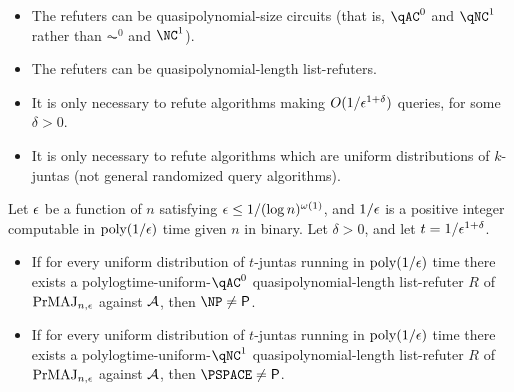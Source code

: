 \begin{itemize}
    \item The refuters can be quasipolynomial-size circuits (that is, $\qAC^0$ and 
    $\qNC^1$ rather than $\AC^0$ and $\NC^1$).
    \item The refuters can be quasipolynomial-length list-refuters. 
    \item It is only necessary to refute algorithms making $O(1/\epsilon^{1+\delta})$ queries,
    for some $\delta > 0$.
    \item It is only necessary to refute algorithms which are uniform distributions of
    $k$-juntas (not general randomized query algorithms).
\end{itemize}

\begin{theorem}
    Let $\epsilon$ be a function of $n$ satisfying $\epsilon \leq 1/(\log n)^{\omega(1)}$, and $1/\epsilon$ is a positive integer
    computable in $\text{poly}(1/\epsilon)$ time given $n$ in binary. Let $\delta > 0$, and let $t = 1/\epsilon^{1+\delta}$.
	\begin{itemize}
		\item If for every uniform distribution of $t$-juntas running in $\text{poly}(1/\epsilon)$ time there exists
        a polylogtime-uniform-$\qAC^0$ quasipolynomial-length list-refuter $R$ of $\mathrm{PrMAJ}_{n, \epsilon}$ against 
        $\mathcal{A}$, then $\NP \neq \PTIME$. 
		\item If for every uniform distribution of $t$-juntas running in $\text{poly}(1/\epsilon)$ time there exists
        a polylogtime-uniform-$\qNC^1$ quasipolynomial-length list-refuter $R$ of $\mathrm{PrMAJ}_{n, \epsilon}$ against 
        $\mathcal{A}$, then $\PSPACE \neq \PTIME$. 
	\end{itemize}
\end{theorem}

